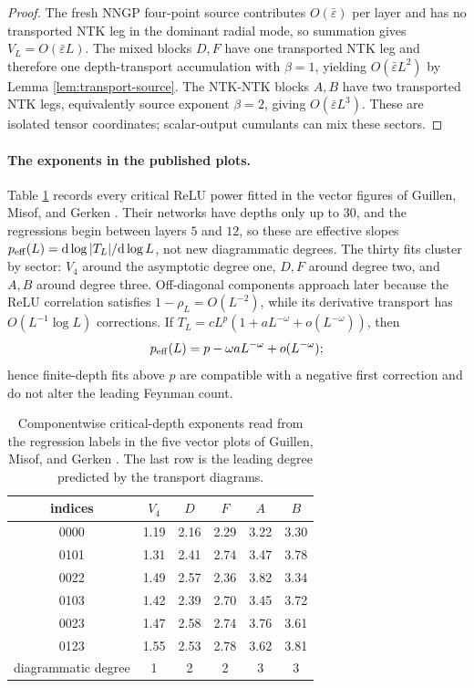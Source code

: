 \documentclass{article}
\newcommand{\barE}{\bar\varepsilon}
\newcommand{\dd}{\mathrm d}
\begin{document}
\begin{proof}
The fresh NNGP four-point source contributes \(O(\barE)\) per layer and has no transported NTK leg in the dominant radial mode, so summation gives \(V_L=O(\barE L)\). The mixed blocks \(D,F\) have one transported NTK leg and therefore one depth-transport accumulation with \(\beta=1\), yielding \(O(\barE L^2)\) by Lemma \ref{lem:transport-source}. The NTK-NTK blocks \(A,B\) have two transported NTK legs, equivalently source exponent \(\beta=2\), giving \(O(\barE L^3)\). These are isolated tensor coordinates; scalar-output cumulants can mix these sectors.
\end{proof}

\paragraph{The exponents in the published plots.}
Table \ref{tab:published-effective-exponents} records every critical ReLU power fitted in the vector figures of Guillen, Misof, and Gerken \citep{FeynmanNTK2026}.  Their networks have depths only up to \(30\), and the regressions begin between layers \(5\) and \(12\), so these are effective slopes
\(p_{\rm eff}(L)=\dd\log|T_L|/\dd\log L\), not new diagrammatic degrees.  The thirty fits cluster by sector: \(V_4\) around the asymptotic degree one, \(D,F\) around degree two, and \(A,B\) around degree three.  Off-diagonal components approach later because the ReLU correlation satisfies \(1-\rho_L=O(L^{-2})\), while its derivative transport has \(O(L^{-1}\log L)\) corrections.  If
\(T_L=cL^p(1+aL^{-\omega}+o(L^{-\omega}))\), then
\begin{equation}
p_{\rm eff}(L)=p-\omega aL^{-\omega}+o(L^{-\omega});
\label{eq:effective-slope-drift}
\end{equation}
hence finite-depth fits above \(p\) are compatible with a negative first correction and do not alter the leading Feynman count.

\begin{table}[t]
\centering
\caption{Componentwise critical-depth exponents read from the regression labels in the five vector plots of Guillen, Misof, and Gerken \citep{FeynmanNTK2026}.  The last row is the leading degree predicted by the transport diagrams.}
\label{tab:published-effective-exponents}
\small
\begin{tabular}{c@{\qquad}ccccc}
\toprule
indices & \(V_4\) & \(D\) & \(F\) & \(A\) & \(B\)\\
\midrule
0000 & 1.19 & 2.16 & 2.29 & 3.22 & 3.30\\
0101 & 1.31 & 2.41 & 2.74 & 3.47 & 3.78\\
0022 & 1.49 & 2.57 & 2.36 & 3.82 & 3.34\\
0103 & 1.42 & 2.39 & 2.70 & 3.45 & 3.72\\
0023 & 1.47 & 2.58 & 2.74 & 3.76 & 3.61\\
0123 & 1.55 & 2.53 & 2.78 & 3.62 & 3.81\\
\midrule
diagrammatic degree & 1 & 2 & 2 & 3 & 3\\
\bottomrule
\end{tabular}
\end{table}
\end{document}
